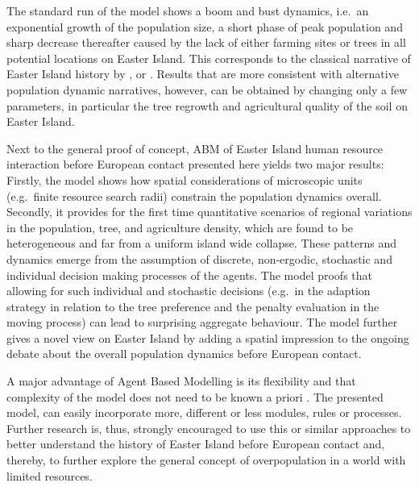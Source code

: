 The standard run of the model shows a boom and bust dynamics, i.e.\ an exponential growth of the population size, a short phase of peak population and sharp decrease thereafter caused by the lack of either farming sites or trees in all potential locations on Easter Island.
This corresponds to the classical narrative of Easter Island history by \citet{Brander1998}, \citet{Diamond2011} or \citet{Bahn2017}.
Results that are more consistent with alternative population dynamic narratives, however, can be obtained by changing only a few parameters, in particular the tree regrowth and agricultural quality of the soil on Easter Island.

Next to the general proof of concept, ABM of Easter Island human resource interaction before European contact presented here yields two major results:
Firstly, the model shows how spatial considerations of microscopic units (e.g.\ finite resource search radii) constrain the population dynamics overall.
Secondly, it provides for the first time quantitative scenarios of regional variations in the population, tree, and agriculture density, which are found to be heterogeneous and far from a uniform island wide collapse.
These patterns and dynamics emerge from the assumption of discrete, non-ergodic, stochastic and individual decision making processes of the agents.
The model proofs that allowing for such individual and stochastic decisions (e.g.\ in the adaption strategy in relation to the tree preference and the penalty evaluation in the moving process) can lead to surprising aggregate behaviour.
The model further gives a novel view on Easter Island by adding a spatial impression to the ongoing debate about the overall population dynamics before European contact.





A major advantage of Agent Based Modelling is its flexibility and that complexity of the model does not need to be known a priori \citep{Bonabeau2002}.
The presented model, can easily incorporate more, different or less modules, rules or processes.
Further research is, thus, strongly encouraged to use this or similar approaches to better understand the history of Easter Island before European contact and, thereby, to further explore the general concept of overpopulation in a world with limited resources.
